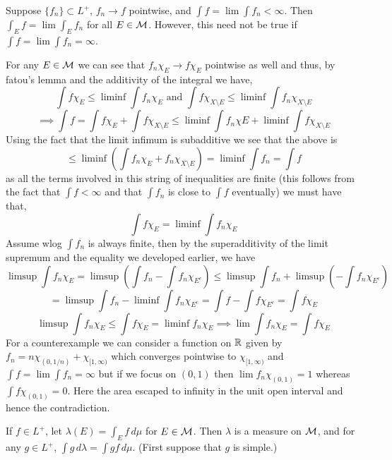 \documentclass[12pt,a4paper]{article}
\begin{document}
\begin{problem}\label{prob:2-13}
Suppose $\{f_n\} \subset L^+$, $f_n \to f$ pointwise, and $\int f = \lim \int f_n < \infty$. Then $\int_E f = \lim \int_E f_n$ for all $E \in \mathcal{M}$. However, this need not be true if $\int f = \lim \int f_n = \infty$.
\end{problem}
\begin{solution}
    For any $E\in\mathcal{M}$ we can see that $f_n\chi_E\longrightarrow f\chi_E$ pointwise as well and thus, by fatou's lemma and the additivity of the integral we have, 
    $$\int f\chi_E\leq\liminf\int f_n\chi_E\text{ and }\int f\chi_{X\setminus E}\leq\liminf\int f_n\chi_{X\setminus E}$$
    $$\implies\int f=\int f\chi_E+\int f\chi_{X\setminus E}\leq\liminf\int f_n\chi E+\liminf\int f\chi_{X\setminus E}$$ 
    Using the fact that the limit infimum is subadditive we see that the above is
    $$\leq\liminf\left(\int f_n\chi_E+f_n\chi_{X\setminus E}\right)=\liminf\int f_n=\int f$$ 
    as all the terms involved in this string of inequalities are finite (this follows from the fact that $\int f<\infty$ and that $\int f_n$ is close to $\int f$ eventually) we must have that, 
    $$\int  f\chi_E=\liminf\int f_n\chi_E$$
    Assume wlog $\int f_n$ is always finite, then by the superadditivity of the limit supremum and the equality we developed earlier, we have
    $$\limsup\int f_n\chi_{E}=\limsup\left(\int f_n-\int f_n\chi_{E^c}\right)\leq\limsup\int f_n+\limsup\left(-\int f_n\chi_{E^c}\right)$$
    $$=\limsup\int f_n-\liminf\int f_n\chi_{E^c}=\int f-\int f\chi_{E^c}=\int f\chi_E$$ 
    $$\limsup\int f_n\chi_E\leq\int f\chi_E=\liminf f_n\chi_E\implies\lim\int f_n\chi_E=\int f\chi_E$$  
    For a counterexample we can consider a function on $\mathbb{R}$ given by $f_n=n\chi_{(0,1/n)}+\chi_{[1,\infty)}$ which converges pointwise to $\chi_{[1,\infty)}$ and $\int f=\lim\int f_n=\infty$ but if we focus on $(0,1)$ then $\lim f_n\chi_{(0,1)}=1$ whereas $\int f\chi_{(0,1)}=0$. 
    Here the area escaped to infinity in the unit open interval and hence the contradiction. 
\end{solution}
\begin{problem}\label{prob:2-14}
If $f \in L^+$, let $\lambda(E) = \int_E f \, d\mu$ for $E \in \mathcal{M}$. Then $\lambda$ is a measure on $\mathcal{M}$, and for any $g \in L^+$, $\int g \, d\lambda = \int gf \, d\mu$. (First suppose that $g$ is simple.)
\end{problem}
\end{document}
